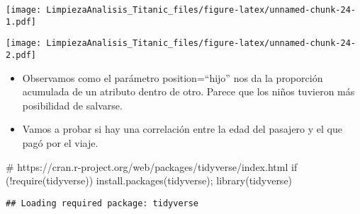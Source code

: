 \documentclass[
]{article}
\newenvironment{Shaded}{\begin{snugshade}}{\end{snugshade}}
\newcommand{\AttributeTok}[1]{\textcolor[rgb]{0.80,0.80,0.80}{#1}}
\newcommand{\CommentTok}[1]{\textcolor[rgb]{0.50,0.62,0.50}{#1}}
\newcommand{\ControlFlowTok}[1]{\textcolor[rgb]{0.94,0.87,0.69}{#1}}
\newcommand{\DecValTok}[1]{\textcolor[rgb]{0.86,0.86,0.80}{#1}}
\newcommand{\FunctionTok}[1]{\textcolor[rgb]{0.94,0.94,0.56}{#1}}
\newcommand{\NormalTok}[1]{\textcolor[rgb]{0.80,0.80,0.80}{#1}}
\newcommand{\SpecialCharTok}[1]{\textcolor[rgb]{0.86,0.64,0.64}{#1}}
\newcommand{\StringTok}[1]{\textcolor[rgb]{0.80,0.58,0.58}{#1}}
\begin{document}
\texttt{[image: LimpiezaAnalisis\_Titanic\_files/figure-latex/unnamed-chunk-24-1.pdf]}

\begin{Shaded}
\end{Shaded}

\texttt{[image: LimpiezaAnalisis\_Titanic\_files/figure-latex/unnamed-chunk-24-2.pdf]}

\begin{itemize}
\item
  Observamos como el parámetro position=``hijo'' nos da la proporción
  acumulada de un atributo dentro de otro. Parece que los niños tuvieron
  más posibilidad de salvarse.
\item
  Vamos a probar si hay una correlación entre la edad del pasajero y el
  que pagó por el viaje.
\end{itemize}

\begin{Shaded}
\begin{Highlighting}[]
\CommentTok{\# https://cran.r{-}project.org/web/packages/tidyverse/index.html}
\ControlFlowTok{if}\NormalTok{ (}\SpecialCharTok{!}\FunctionTok{require}\NormalTok{(}\StringTok{\textquotesingle{}tidyverse\textquotesingle{}}\NormalTok{)) }\FunctionTok{install.packages}\NormalTok{(}\StringTok{\textquotesingle{}tidyverse\textquotesingle{}}\NormalTok{); }\FunctionTok{library}\NormalTok{(}\StringTok{\textquotesingle{}tidyverse\textquotesingle{}}\NormalTok{)}
\end{Highlighting}
\end{Shaded}

\begin{verbatim}
## Loading required package: tidyverse
\end{verbatim}
\end{document}
